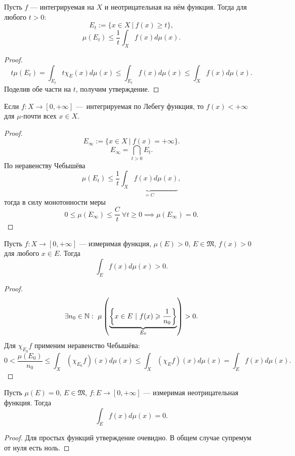 \begin{statement}
    Пусть $f$ — интегрируемая на $X$ и неотрицательная на нём функция.
    Тогда для любого $t>0$:
    \[E_t := \{x \in X \ | \ f(x) \geqslant t\},\]
    \[\mu(E_t) \leqslant \frac{1}{t} \int_X f(x) d\mu(x).\]
\end{statement} 
\begin{proof}
    \[t \mu(E_t)
    = \int_{E_t} t \chi_E(x) d\mu(x)
    \leqslant \int_{E_t} f(x) d\mu(x)
    \leqslant \int_X f(x) d\mu(x).\]
    Поделив обе части на $t$, получим утверждение.
\end{proof} 

\begin{statement}
    Если $f: X \to [0, +\infty]$ — интегрируемая по Лебегу функция, то $f(x) < +\infty$ для $\mu$-почти всех $x \in X$.
\end{statement} 
\begin{proof}
    $$E_{\infty} := \{x \in X \ | \ f(x) = +\infty\}.$$
    \[E_{\infty} = \bigcap\limits_{t>0} E_t.\]
    По неравенству Чебышёва
    \[\mu(E_t) \leqslant \frac{1}{t} \underbrace{\int_X f(x) d\mu(x)}_{=C},\]
    тогда в силу монотонности меры
    \[0 \leqslant \mu(E_\infty) \leqslant \frac{C}{t} \ \forall t \geqslant 0
    \implies
    \mu(E_\infty) = 0.\]
\end{proof} 

\begin{statement}
    Пусть $f: X \to [0, +\infty]$ — измеримая функция, $\mu(E) > 0$, $E \in \mathfrak{M}$, $f(x) > 0$ для любого $x \in E$.
    Тогда 
    \[\int_E f(x) d\mu(x) > 0.\]
\end{statement} 
\begin{proof}
    \[\exists n_0 \in \N: \ \mu\left(\underbrace{\left\{x \in E \ | \ f(x) \geqslant \frac{1}{n_0}\right\}}_{E_0}\right) > 0.\]
    Для $\chi_{E_0} f$ применим неравенство Чебышёва:
    \[0 < \frac{\mu(E_0)}{n_0} 
    \leqslant \int_X (\chi_{E_0}f)(x) d\mu(x)
    \leqslant \int_X (\chi_Ef)(x) d\mu(x)
    = \int_E f(x) d\mu(x).\]
\end{proof} 

\begin{statement}
    Пусть $\mu(E) = 0$, $E \in \mathfrak{M}$, $f: E \to [0, +\infty]$ — измеримая неотрицательная функция.
    Тогда
    \[\int_E f(x) d\mu(x) = 0.\]
\end{statement} 
\begin{proof}
    Для простых функций утверждение очевидно.
    В общем случае супремум от нуля есть ноль.
\end{proof} 

